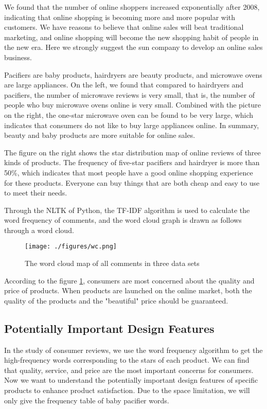\documentclass{mcmthesis}
\begin{document}
We found that the number of online shoppers increased exponentially after 2008, indicating that online shopping is becoming more and more popular with customers. We have reasons to believe that online sales will beat traditional marketing, and online shopping will become the new shopping habit of people in the new era. Here we strongly suggest the sun company to develop an online sales business.

Pacifiers are baby products, hairdryers are beauty products, and microwave ovens are large appliances. On the left, we found that compared to hairdryers and pacifiers, the number of microwave reviews is very small, that is, the number of people who buy microwave ovens online is very small. Combined with the picture on the right, the one-star microwave oven can be found to be very large, which indicates that consumers do not like to buy large appliances online. In summary, beauty and baby products are more suitable for online sales.

The figure on the right shows the star distribution map of online reviews of three kinds of products. The frequency of five-star pacifiers and hairdryer is more than 50\%, which indicates that most people have a good online shopping experience for these products. Everyone can buy things that are both cheap and easy to use to meet their needs.

Through the NLTK of Python, the TF-IDF algorithm is used to calculate the word frequency of comments, and the word cloud graph is drawn as follows through a word cloud.

\begin{figure}[H]
	\centering
	\texttt{[image: ./figures/wc.png]}
	\caption{The word cloud map of all comments in three data sets} \label{wordCloud}
\end{figure}

According to the figure \ref{wordCloud}, consumers are most concerned about the quality and price of products. When products are launched on the online market, both the quality of the products and the "beautiful" price should be guaranteed.

\subsection{Potentially Important Design Features}

In the study of consumer reviews, we use the word frequency algorithm to get the high-frequency words corresponding to the stars of each product. We can find that quality, service, and price are the most important concerns for consumers. Now we want to understand the potentially important design features of specific products to enhance product satisfaction. Due to the space limitation, we will only give the frequency table of baby pacifier words.
\end{document}
